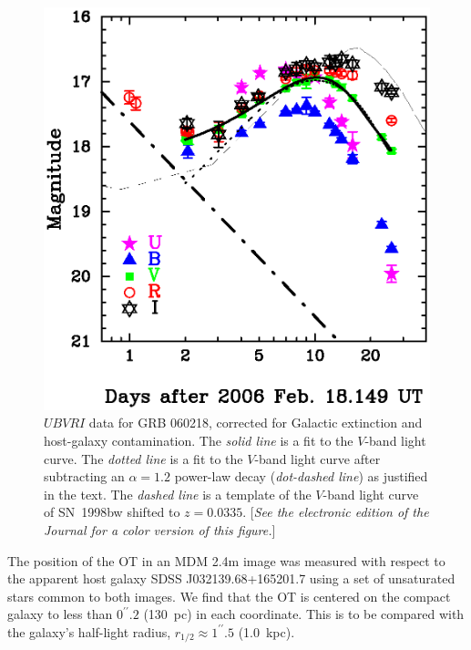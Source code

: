 \documentclass[apj]{emulateapj}
\begin{document}
\begin{figure}[t]
\centerline{
  \includegraphics[width=0.97\linewidth]{f1.eps}\hfill
}
\caption{$UBVRI$ data for GRB 060218, corrected for Galactic
extinction and host-galaxy contamination.
The {\it solid line} is a fit to the $V$-band light curve.
The {\it dotted line} is a fit to the $V$-band light curve after
subtracting an $\alpha = 1.2$ power-law decay ({\it dot-dashed line})
as justified in the text.
The {\it dashed line} is a template of the $V$-band
light curve of SN~1998bw \citep{galama} shifted to $z=0.0335$.
[{\it See the electronic edition of the Journal for a color
version of this figure.}]}
\label{light_curve}
\end{figure}



The position of the OT in an MDM 2.4m image
was measured with respect to the apparent host galaxy SDSS J032139.68+165201.7
using a set of unsaturated stars common to both images.  We find that the OT
is centered on the compact galaxy to less than $0^{\prime\prime}\!.2$ (130~pc)
in each coordinate. This is to be compared with the galaxy's half-light radius, 
$r_{1/2} \approx  1^{\prime\prime}\!.5$ (1.0~kpc).
\end{document}
